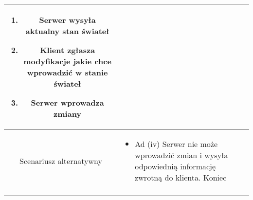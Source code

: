 \documentclass{article}
\begin{document}
\begin{enumerate}
\begin{enumerate}
\begin{table}[H]
\begin{tabular}{|c|p{7cm}|}
\begin{enumerate}
\item Serwer wysyła aktualny stan świateł

\item Klient zgłasza modyfikacje jakie chce wprowadzić w stanie świateł

\item Serwer wprowadza zmiany\end{enumerate} \\
						\hline
						Scenariusz alternatywny & \begin{itemize}\item Ad (iv) Serwer nie może wprowadzić zmian i wysyła odpowiednią informację zwrotną do klienta. Koniec\end{itemize}                                                                                                                               \\
						\\
						\hline
					\end{tabular}
				\end{table}


\end{enumerate}
\end{enumerate}
\end{document}
